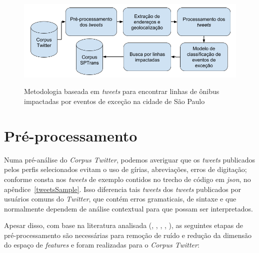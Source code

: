 \documentclass[
	12pt,				%
	oneside,			%
	a4paper,			%
	english,			%
	brazil				%
	]{abntex2ppgsi}
\begin{document}
{{{\begin{figure}[!htb]
	\centering
 	  \caption{Metodologia baseada em \textit{tweets} para encontrar linhas de ônibus impactadas por eventos de exceção na cidade de São Paulo}
		\includegraphics[width=0.7\linewidth]{images/tweet_based_methodology_pt.png}
	\label{fig:tweet_based_methodology}
\end{figure}

\section{Pré-processamento}
\label{preprocessing}

Numa pré-análise do \textit{Corpus Twitter}, podemos averiguar que os \textit{tweets} publicados pelos perfis selecionados evitam o uso de gírias, abreviações, erros de digitação; conforme consta nos \textit{tweets} de exemplo contidos no trecho de código em \textit{json}, no apêndice~\ref{tweetsSample}.  Isso diferencia tais \textit{tweets} dos \textit{tweets} publicados por usuários comuns do \textit{Twitter}, que contém erros gramaticais, de sintaxe e que normalmente dependem de análise contextual para que possam ser interpretados.

Apesar disso, com base na literatura analisada (\cite{Steiger2015Census}, \cite{Middleton2014}, \cite{Kobdani2010}, \cite{Setiawan2017},  \cite{Zagal2016}), as seguintes etapas de pré-processamento são necessárias para remoção de ruído e redução da dimensão do espaço de \textit{features} e foram realizadas para o \textit{Corpus Twitter}:

}}}
\end{document}
